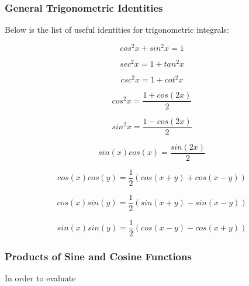 \subsubsection{General Trigonometric Identities}
\begin{thm}
  Below is the list of useful identities for trigonometric integrals:

  \begin{alist}
    \item \begin{rlist}
      \item

      $$cos^{2}x+sin^{2}x=1$$

      \item

      $$sec^{2}x=1+tan^{2}x$$

      \item

      $$csc^{2}x=1+cot^{2}x$$
    \end{rlist}
    \item \begin{rlist}
      \item

      $$cos^{2}x=\frac{1+cos(2x)}{2}$$

      \item

      $$sin^{2}x=\frac{1-cos(2x)}{2}$$

      \item

      $$sin(x)cos(x)=\frac{sin(2x)}{2}$$
    \end{rlist}
    \item \begin{rlist}
      \item

      $$cos(x)cos(y)=\frac{1}{2}(cos(x+y)+cos(x-y))$$

      \item

      $$cos(x)sin(y)=\frac{1}{2}(sin(x+y)-sin(x-y))$$

      \item

      $$sin(x)sin(y)=\frac{1}{2}(cos(x-y)-cos(x+y))$$
    \end{rlist}
  \end{alist}
\end{thm}

\subsubsection{Products of Sine and Cosine Functions}
In order to evaluate

